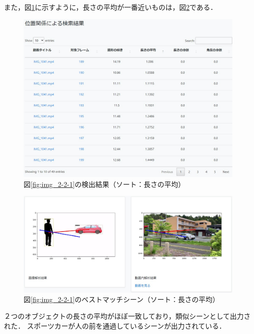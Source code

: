 \documentclass[a4j,12pt,dvipdfmx]{jreport}
\begin{document}
また，図\ref{fig:img_2-2-4}に示すように，長さの平均が一番近いものは，図\ref{fig:img_2-2-5}である．
\begin{figure}[b]
  \centering
  \includegraphics[width=13cm]{image/result_2_2_4.jpg}
  \caption{図\ref{fig:img_2-2-1}の検出結果（ソート：長さの平均）}
  \label{fig:img_2-2-4}
\end{figure}

\begin{figure}[b]
  \centering
  \includegraphics[width=13cm]{image/result_2_2_5.jpg}
  \caption{図\ref{fig:img_2-2-1}のベストマッチシーン（ソート：長さの平均）}
  \label{fig:img_2-2-5}
\end{figure}

２つのオブジェクトの長さの平均がほぼ一致しており，類似シーンとして出力された．
スポーツカーが人の前を通過しているシーンが出力されている．
\end{document}
